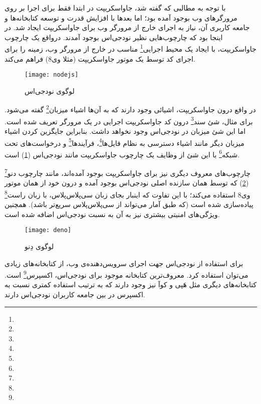 
با توجه به مطالبی که گفته شد،‌ جاواسکریپت در ابتدا فقط برای اجرا بر روی مرورگرهای وب بوجود آمده بود؛ اما بعدها با افزایش قدرت و توسعه کتابخانه‌ها و جامعه کاربری آن، نیاز به اجرای خارج از مرورگر وب برای جاواسکریپت ایجاد شد. در اینجا بود که چارچوب‌هایی نظیر نودجی‌اس بوجود آمدند. درواقع یک چارچوب جاواسکریپت، با ایجاد یک محیط اجرایی\footnote{} مناسب در خارج از مرورگر وب، زمینه را برای اجرای کد توسط یک موتور جاواسکریپت (مثلا وی8) فراهم می‌کند\cite{v8}.

\begin{figure}[H]
	\centering
	\texttt{[image: nodejs]}
	\caption{لوگوی نودجی‌اس}
	\label{fig:nodejs}
\end{figure}

در واقع درون جاواسکریپت، اشیائی وجود دارند که به آن‌ها اشیاء میزبان\footnote{} گفته می‌شود. برای مثال، شئ سند\footnote{} درون کد جاواسکریپت اجرایی در یک مرورگر تعریف شده است. اما این شئ میزبان در نودجی‌اس وجود نخواهد داشت. بنابراین جایگزین کردن اشیاء میزبان دیگر مانند اشیاء دسترسی به نظام فایل‌ها\footnote{}، فرآیندها\footnote{} و درخواست‌های تحت شبکه\footnote{} با این شئ از وظایف یک چارچوب جاواسکریپت مانند نودجی‌اس (\cref{fig:nodejs}) است\cite{wiki:nodejs}.

چارچوب‌های معروف دیگری نیز برای جاواسکریپت بوجود آمده‌اند، مانند چارچوب دنو\footnote{} (\cref{fig:deno}) که توسط همان سازنده اصلی نودجی‌اس بوجود آمده و درون خود از همان موتور وی8 استفاده می‌کند؛ با این تفاوت که اینبار بجای زبان سی‌پلاس‌پلاس، با زبان راست\footnote{} پیاده‌سازی شده است (که طبق آمار می‌تواند از سی‌پلاس‌پلاس سریع‌تر باشد). همچنین ویژگی‌های امنیتی بیشتری نیز به آن به نسبت نودجی‌اس اضافه شده است\cite{wiki:deno}.

\begin{figure}[H]
	\centering
	\texttt{[image: deno]}
	\caption{لوگوی دِنو}
	\label{fig:deno}
\end{figure}



برای استفاده از نودجی‌اس جهت اجرای سرویس‌دهنده‌ی وب، از کتابخانه‌های زیادی می‌توان استفاده کرد. معروف‌ترین کتابخانه موجود برای نودجی‌اس، اکسپرس\footnote{} است. کتابخانه‌های دیگری مثل هَپی و کوآ نیز وجود دارند که به ترتیب استفاده کمتری نسبت به اکسپرس در بین جامعه کاربران نودجی‌اس دارند\cite{wiki:express}.

